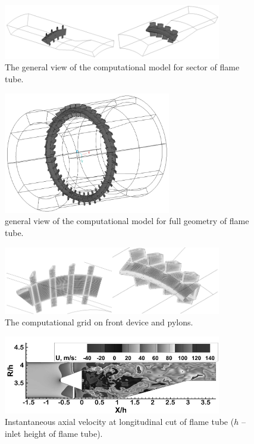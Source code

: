 \documentclass[
11pt,%
tightenlines,%
twoside,%
onecolumn,%
nofloats,%
nobibnotes,%
nofootinbib,%
superscriptaddress,%
noshowpacs,%
centertags]%
{revtex4}
\begin{document}
\begin{figure}[h]
\setcaptionmargin{5mm}
\onelinecaptionstrue
\includegraphics[width=0.85\textwidth]{pics/p1.png}
\caption{The general view of the computational model for sector of flame tube.}
\label{fig:p1}
\end{figure}

\begin{figure}[h]
\setcaptionmargin{5mm}
\onelinecaptionstrue
\includegraphics[width=0.65\textwidth]{pics/p2.png}
\caption{general view of the computational model for full geometry of flame tube.}
\label{fig:p2}
\end{figure}

\begin{figure}[h]
\setcaptionmargin{5mm}
\onelinecaptionstrue
\includegraphics[width=0.85\textwidth]{pics/p3.png}
\caption{The computational grid on front device and pylons.}
\label{fig:p3}
\end{figure}

\begin{figure}[h]
\setcaptionmargin{5mm}
\onelinecaptionstrue
\includegraphics[width=0.85\textwidth]{pics/p4.png}
\caption{Instantaneous axial velocity at longitudinal cut of flame tube ($h$ – inlet height of flame tube).}
\label{fig:p4}
\end{figure}
\end{document}
